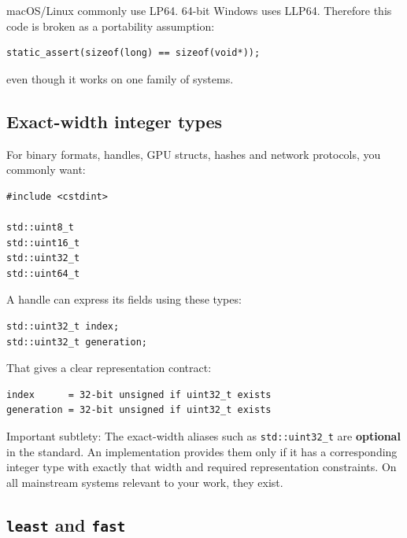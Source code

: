 macOS/Linux commonly use LP64. 64-bit Windows uses LLP64. Therefore this code is broken as a portability assumption:

\begin{verbatim}
static_assert(sizeof(long) == sizeof(void*));
\end{verbatim}

even though it works on one family of systems.

\subsection{Exact-width integer types}\label{05-engine-i-ch002-exact-width-integer-types}

\hypertarget{05-engine-i-ch002-exact-width-integer-types}{}

For binary formats, handles, GPU structs, hashes and network protocols, you commonly want:

\begin{verbatim}
#include <cstdint>

std::uint8_t
std::uint16_t
std::uint32_t
std::uint64_t
\end{verbatim}

A handle can express its fields using these types:

\begin{verbatim}
std::uint32_t index;
std::uint32_t generation;
\end{verbatim}

That gives a clear representation contract:

\begin{verbatim}
index      = 32-bit unsigned if uint32_t exists
generation = 32-bit unsigned if uint32_t exists
\end{verbatim}

Important subtlety: The exact-width aliases such as \texttt{std::uint32\_t} are \textbf{optional} in the standard. An implementation provides them only if it has a corresponding integer type with exactly that width and required representation constraints. On all mainstream systems relevant to your work, they exist.

\subsection{\texorpdfstring{\texttt{least} and \texttt{fast}}{least and fast}}\label{05-engine-i-ch002-least-and-fast}

\hypertarget{05-engine-i-ch002-least-and-fast}{}

